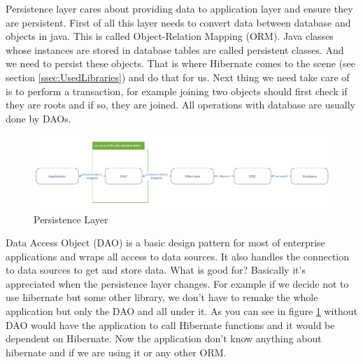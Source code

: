 Persistence layer cares about providing data to application layer and ensure they
are persistent. First of all this layer needs to convert data between database and
objects in java. This is called Object-Relation Mapping (ORM). Java classes whose
instances are stored in database tables are called persistent classes. And we need
to persist these objects. That is where Hibernate comes to the scene (see section
\ref{ssec:UsedLibraries}) and do that for us. Next thing we need take care of is
to perform a transaction, for example joining two objects should first check if
they are roots and if so, they are joined. All operations with database are usually
done by DAOs.

\begin{figure}[!htb]
        \centering
        \includegraphics[width=\textwidth]{Images/PersistentLayer}
        \caption{Persistence Layer}
        \label{fig:PersistentLayer}
\end{figure}

Data Access Object (DAO) is a basic design pattern for most of enterprise applications
and wraps all access to data sources. It also handles the connection to data sources
to get and store data. What is good for? Basically it's appreciated when the persistence
layer changes. For example if we decide not to use hibernate but some other library,
we don't have to remake the whole application but only the DAO and all under it.
As you can see in figure \ref{fig:PersistentLayer} without DAO would have the application
to call Hibernate functions and it would be dependent on Hibernate. Now the application
don't know anything about hibernate and if we are using it or any other ORM.

